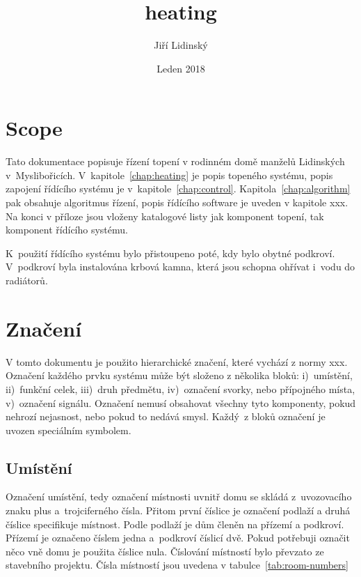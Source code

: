 \documentclass[a4paper,draft]{book}
\title{heating}
\author{Jiří Lidinský}
\date{Leden 2018}
\begin{document}
\frontmatter

\maketitle

\chapter*{Scope}

    Tato dokumentace popisuje řízení topení v rodinném domě manželů Lidinských
    v~Myslibořicích. V~kapitole~\ref{chap:heating} je popis topeného systému,
    popis zapojení řídícího systému je v~kapitole~\ref{chap:control}.
    Kapitola~\ref{chap:algorithm} pak obsahuje algoritmus řízení,
    popis řídícího software je uveden v kapitole xxx. Na konci v příloze jsou
    vloženy katalogové listy jak komponent topení, tak komponent řídícího
    systému.

    K~použití řídícího systému bylo přistoupeno poté, kdy bylo obytné podkroví.
    V~podkroví byla instalována krbová kamna, která jsou schopna ohřívat
    i~vodu do radiátorů.

\tableofcontents

\mainmatter

\chapter{Značení}

    V tomto dokumentu je použito hierarchické značení, které vychází z normy
    xxx. Označení každého prvku systému může být složeno z několika bloků:
    i)~umístění, ii)~funkční celek, iii)~druh předmětu, iv)~označení svorky,
    nebo přípojného místa, v)~označení signálu. Označení nemusí obsahovat
    všechny tyto komponenty, pokud nehrozí nejasnost, nebo pokud to nedává
    smysl. Každý~z bloků označení je uvozen speciálním symbolem.

\section{Umístění}

    Označení umístění, tedy označení místnosti uvnitř domu se skládá
    z~uvozovacího znaku plus a~trojciferného čísla. Přitom první číslice
    je označení podlaží a druhá číslice specifikuje místnost. Podle podlaží
    je dům členěn na přízemí a podkroví. Přízemí je označeno číslem jedna
    a~podkroví číslicí dvě. Pokud potřebuji označit něco vně domu je použita
    číslice nula. Číslování místností bylo převzato ze stavebního projektu.
    Čísla místností jsou uvedena v tabulce~\ref{tab:room-numbers}
\end{document}
